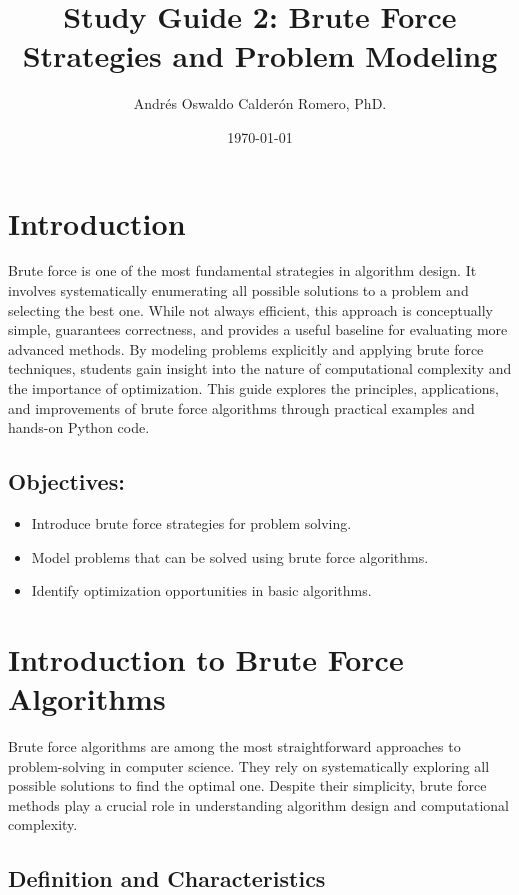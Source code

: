 \documentclass[12pt]{article}
\title{Study Guide 2: Brute Force Strategies and Problem Modeling}
\author{Andrés Oswaldo Calderón Romero, PhD.}
\date{\today}
\begin{document}
    \maketitle

    \section*{Introduction}
    Brute force is one of the most fundamental strategies in algorithm design. It involves systematically enumerating all possible solutions to a problem and selecting the best one. While not always efficient, this approach is conceptually simple, guarantees correctness, and provides a useful baseline for evaluating more advanced methods. By modeling problems explicitly and applying brute force techniques, students gain insight into the nature of computational complexity and the importance of optimization. This guide explores the principles, applications, and improvements of brute force algorithms through practical examples and hands-on Python code.

    \subsection*{Objectives:}
        \begin{itemize}
            \item Introduce brute force strategies for problem solving.
            \item Model problems that can be solved using brute force algorithms.
            \item Identify optimization opportunities in basic algorithms.
        \end{itemize}

    \section{Introduction to Brute Force Algorithms}
    Brute force algorithms are among the most straightforward approaches to problem-solving in computer science. They rely on systematically exploring all possible solutions to find the optimal one. Despite their simplicity, brute force methods play a crucial role in understanding algorithm design and computational complexity.

    \subsection{Definition and Characteristics}
\end{document}
